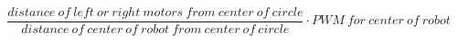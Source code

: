 \documentclass[10pt]{book}
\begin{document}
\begin{mdSnippets}
\begin{mdDisplaySnippet}[e8cafa34b9965bc9800090f872756b30]%
\begin{mdDiv}[class={mathdisplay,math-display},color={},math-needpdf={}]%
\[%
\frac{distance \ of \ left \ or \ right \ motors \ from \ center \ of \ circle}{distance \ of \ center \ of \ robot \ from \ center \ of \ circle} \cdot PWM \ for \ center \ of \ robot
\]%
\end{mdDiv}%


\end{mdDisplaySnippet}
\end{mdSnippets}
\end{document}
